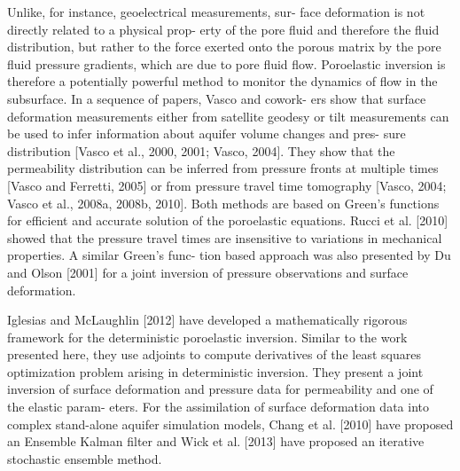 \documentclass[11pt,final]{article}%
\begin{document}
Unlike, for instance, geoelectrical measurements, sur-
face deformation is not directly related to a physical prop- erty of the pore fluid and therefore the fluid distribution, but rather to the force exerted onto the porous matrix by the pore fluid pressure gradients, which are due to pore fluid flow. Poroelastic inversion is therefore a potentially powerful method to monitor the dynamics of flow in the subsurface. In a sequence of papers, Vasco and cowork- ers show that surface deformation measurements either from satellite geodesy or tilt measurements can be used to infer information about aquifer volume changes and pres- sure distribution [Vasco et al., 2000, 2001; Vasco, 2004]. They show that the permeability distribution can be inferred from pressure fronts at multiple times [Vasco and Ferretti, 2005] or from pressure travel time tomography [Vasco, 2004; Vasco et al., 2008a, 2008b, 2010]. Both methods are based on Green’s functions for efficient and accurate solution of the poroelastic equations. Rucci et al. [2010] showed that the pressure travel times are insensitive to variations in mechanical properties. A similar Green’s func- tion based approach was also presented by Du and Olson [2001] for a joint inversion of pressure observations and surface deformation.

Iglesias and McLaughlin [2012] have developed a mathematically rigorous framework for the deterministic poroelastic inversion. Similar to the work presented here, they use adjoints to compute derivatives of the least squares optimization problem arising in deterministic inversion. They present a joint inversion of surface deformation and pressure data for permeability and one of the elastic param- eters. For the assimilation of surface deformation data into complex stand-alone aquifer simulation models, Chang et al. [2010] have proposed an Ensemble Kalman filter and Wick et al. [2013] have proposed an iterative stochastic ensemble method.
\end{document}
